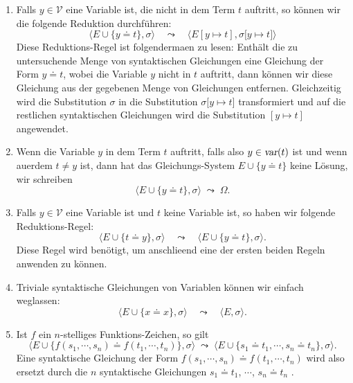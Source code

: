 \begin{enumerate}
\item Falls $y\in\mathcal{V}$ eine Variable ist, die nicht in dem Term $t$ auftritt, so
      k\"{o}nnen wir die folgende Reduktion durchf\"{u}hren: 
      \[ \Big\langle E \cup \big\{ y \doteq t \big\}, \sigma \Big\rangle \quad\leadsto\quad 
         \Big\langle E[y \mapsto t], \sigma\big[ y \mapsto t \big] \Big\rangle 
      \]
      Diese Reduktions-Regel ist folgenderma\3en zu lesen: Enth\"{a}lt die zu untersuchende
      Menge von syntaktischen Gleichungen eine Gleichung der Form $y \doteq t$, wobei die
      Variable $y$ nicht in $t$ auftritt, dann k\"{o}nnen wir diese Gleichung aus der
      gegebenen Menge von Gleichungen entfernen.  Gleichzeitig wird die Substitution
      $\sigma$ in die Substitution $\sigma\big[ y \mapsto t \big]$ transformiert und auf die restlichen syntaktischen Gleichungen
      wird die Substitution $[y \mapsto t]$ angewendet.
\item Wenn die Variable $y$  in dem Term $t$ auftritt, falls also $y \in \textsl{var}(t)$
      ist und wenn au\3erdem $t \not= y$ ist, dann hat das Gleichungs-System 
      $E \cup \big\{ y \doteq t \big\}$ keine L\"{o}sung, wir schreiben 
      \[ \Big\langle E \cup \big\{ y \doteq t \big\}, \sigma \Big\rangle\;\leadsto\; \Omega. \]
\item Falls $y\in\mathcal{V}$ eine Variable ist und $t$ keine Variable ist, so haben wir folgende Reduktions-Regel:
      \[ \Big\langle E \cup \big\{ t \doteq y \big\}, \sigma \Big\rangle \quad\leadsto\quad 
         \Big\langle E \cup \big\{ y \doteq t \big\}, \sigma \Big\rangle.
      \]   
      Diese Regel wird ben\"{o}tigt, um anschlie\3end eine der ersten beiden Regeln anwenden zu
      k\"{o}nnen.
\item Triviale syntaktische Gleichungen von Variablen k\"{o}nnen wir einfach weglassen:
      \[ \Big\langle E \cup \big\{ x \doteq x \big\}, \sigma \Big\rangle \quad\leadsto\quad
         \Big\langle E, \sigma \Big\rangle.
      \]   
\item Ist $f$ ein $n$-stelliges Funktions-Zeichen, so gilt 
      \[ \Big\langle E \cup \big\{ f(s_1,\cdots,s_n) \doteq f(t_1,\cdots,t_n) \big\}, \sigma \Big\rangle 
         \;\leadsto\; 
         \Big\langle E \cup \big\{ s_1 \doteq t_1, \cdots, s_n \doteq t_n\}, \sigma \Big\rangle.
      \]   
      Eine syntaktische Gleichung der Form $f(s_1,\cdots,s_n) \doteq f(t_1,\cdots,t_n)$
      wird also ersetzt durch die $n$ syntaktische Gleichungen $s_1 \doteq t_1$, $\cdots$, $s_n \doteq t_n$      .


\end{enumerate}
